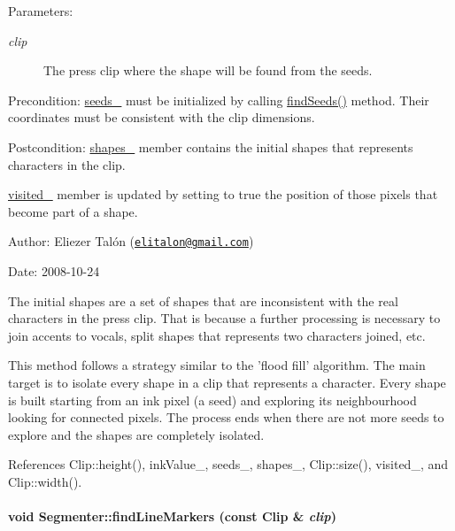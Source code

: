 \begin{Desc}
\item[Parameters:]
\begin{description}
\item[{\em clip}]The press clip where the shape will be found from the seeds.\end{description}
\end{Desc}
\begin{Desc}
\item[Precondition:]\hyperlink{class_segmenter_7859d050250b9fdf7c96374f80008d6e}{seeds\_\-} must be initialized by calling \hyperlink{class_segmenter_bacab187b543a51c5322c01fc0a29ffb}{findSeeds()} method. Their coordinates must be consistent with the clip dimensions.\end{Desc}
\begin{Desc}
\item[Postcondition:]\hyperlink{class_segmenter_41b94ede2829063e0937dc150756e77e}{shapes\_\-} member contains the initial shapes that represents characters in the clip. 

\hyperlink{class_segmenter_fe4dd18749f268aae2b26a1abff6a607}{visited\_\-} member is updated by setting to true the position of those pixels that become part of a shape.\end{Desc}
\begin{Desc}
\item[Author:]Eliezer Talón (\href{mailto:elitalon@gmail.com}{\tt elitalon@gmail.com}) \end{Desc}
\begin{Desc}
\item[Date:]2008-10-24\end{Desc}
The initial shapes are a set of shapes that are inconsistent with the real characters in the press clip. That is because a further processing is necessary to join accents to vocals, split shapes that represents two characters joined, etc.

This method follows a strategy similar to the 'flood fill' algorithm. The main target is to isolate every shape in a clip that represents a character. Every shape is built starting from an ink pixel (a seed) and exploring its neighbourhood looking for connected pixels. The process ends when there are not more seeds to explore and the shapes are completely isolated. 

References Clip::height(), inkValue\_\-, seeds\_\-, shapes\_\-, Clip::size(), visited\_\-, and Clip::width().\hypertarget{class_segmenter_ad8893282742e811dd7fff172ec03c85}{
\paragraph[findLineMarkers]{\setlength{\rightskip}{0pt plus 5cm}void Segmenter::findLineMarkers (const {\bf Clip} \& {\em clip})}\hfill}
\label{class_segmenter_ad8893282742e811dd7fff172ec03c85}


